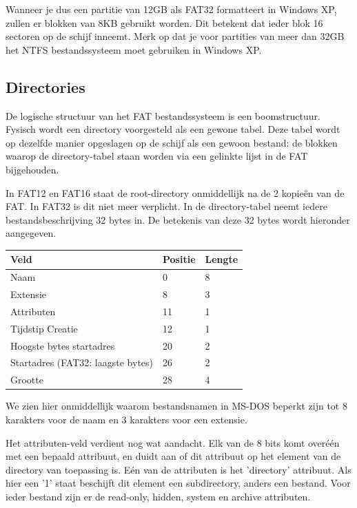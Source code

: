 Wanneer je dus een partitie van 12GB als FAT32 formatteert in
Windows XP, zullen er blokken van 8KB gebruikt worden. Dit betekent
dat ieder blok 16 sectoren op de schijf inneemt. Merk op dat je voor
partities van meer dan 32GB het NTFS bestandssysteem moet gebruiken
in Windows XP.

\subsection{Directories}

De logische structuur van het FAT bestandssysteem is een
boomstructuur. Fysisch wordt een directory voorgesteld als een gewone
tabel. Deze tabel wordt op dezelfde manier opgeslagen op de schijf als
een gewoon bestand: de blokken waarop de directory-tabel staan worden
via een gelinkte lijst in de FAT bijgehouden.

In FAT12 en FAT16 staat de root-directory onmiddellijk na de 2
kopie\"en van de FAT. In FAT32 is dit niet meer verplicht. In de
directory-tabel neemt iedere bestandsbeschrijving 32 bytes in. De
betekenis van deze 32 bytes wordt hieronder aangegeven.

\begin{center}
\begin{tabular}{|l|l|l|}
\hline
Veld                              & Positie & Lengte \\
\hline
Naam                              & 0       & 8      \\
Extensie                          & 8       & 3      \\
Attributen                        & 11      & 1      \\
Tijdstip Creatie                  & 12      & 1      \\
Hoogste bytes startadres          & 20      & 2      \\
Startadres (FAT32: laagste bytes) & 26      & 2      \\
Grootte                           & 28      & 4      \\
\hline
\end{tabular}
\end{center}

We zien hier onmiddellijk waarom bestandsnamen in MS-DOS beperkt
zijn tot 8 karakters voor de naam en 3 karakters voor een
extensie.

Het attributen-veld verdient nog wat aandacht. Elk van de 8 bits
komt over\'e\'en met een bepaald attribuut, en duidt aan of dit attribuut
op het element van de directory van toepassing is. E\'en van de
attributen is het 'directory' attribuut. Als hier een '1' staat
beschijft dit element een subdirectory, anders een bestand. Voor ieder
bestand zijn er de read-only, hidden, system en archive
attributen.

